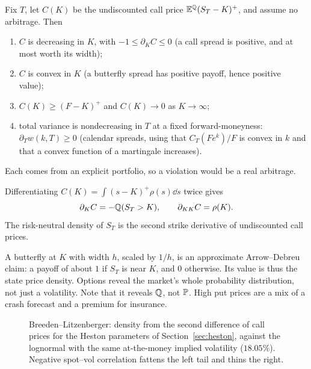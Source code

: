 Fix $T$, let $C(K)$ be the undiscounted call price $\mathbb{E}^{\mathbb{Q}}(S_T-K)^+$, and assume no arbitrage. Then
\begin{enumerate}
\item $C$ is decreasing in $K$, with $-1\le\partial_KC\le0$ (a call spread is positive, and at most worth its width);
\item $C$ is convex in $K$ (a butterfly spread has positive payoff, hence positive value);
\item $C(K)\ge(F-K)^+$ and $C(K)\to0$ as $K\to\infty$;
\item total variance is nondecreasing in $T$ at a fixed forward-moneyness: $\partial_Tw(k,T)\ge0$ (calendar spreads, using that $C_T(Fe^{k})/F$ is convex in $k$ and that a convex function of a martingale increases).
\end{enumerate}
Each comes from an explicit portfolio, so a violation would be a real arbitrage.

\begin{theorem}\label{thm:bl}
Differentiating $C(K)=\int(s-K)^+\rho(s)\dd s$ twice gives
\[
\partial_KC=-\mathbb{Q}(S_T>K),\qquad\partial_{KK}C=\rho(K).
\]
The risk-neutral density of $S_T$ is the second strike derivative of undiscounted call prices.
\end{theorem}

\begin{intuition}
A butterfly at $K$ with width $h$, scaled by $1/h$, is an approximate Arrow--Debreu claim: a payoff of about $1$ if $S_T$ is near $K$, and $0$ otherwise. Its value is thus the state price density. Options reveal the market's whole probability distribution, not just a volatility. Note that it reveals $\mathbb{Q}$, not $\mathbb{P}$. High put prices are a mix of a crash forecast and a premium for insurance.
\end{intuition}

\begin{figure}[t]
\centering
{}
\caption{Breeden--Litzenberger: density from the second difference of call prices for the Heston parameters of Section~\ref{sec:heston}, against the lognormal with the same at-the-money implied volatility ($18.05\%$). Negative spot--vol correlation fattens the left tail and thins the right.}\label{fig:density}
\end{figure}


